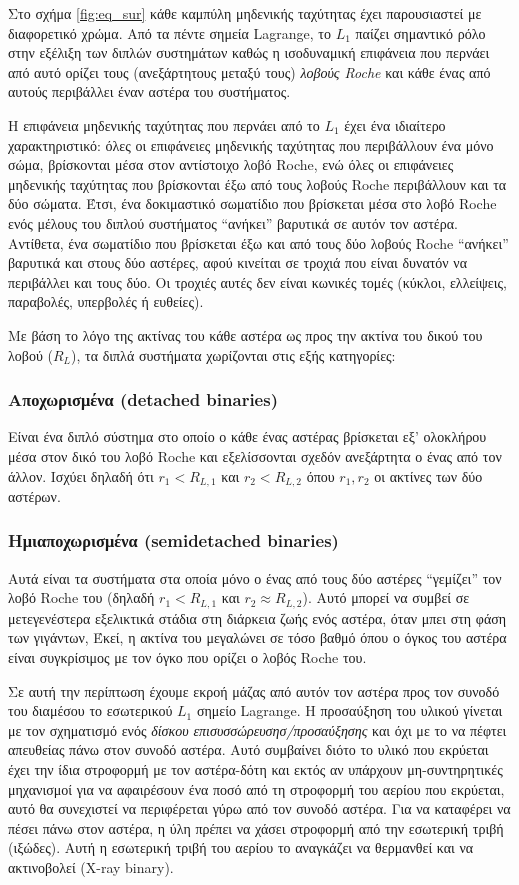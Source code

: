 Στο σχήμα \ref{fig:eq_sur} κάθε καμπύλη μηδενικής ταχύτητας έχει παρουσιαστεί με διαφορετικό χρώμα. Από τα πέντε σημεία Lagrange, το $L_1$ παίζει σημαντικό ρόλο στην εξέλιξη των διπλών συστημάτων καθώς η ισοδυναμική επιφάνεια που περνάει από αυτό ορίζει τους (ανεξάρτητους μεταξύ τους) \textit{λοβούς Roche} και κάθε ένας από αυτούς περιβάλλει έναν αστέρα του συστήματος.

Η επιφάνεια μηδενικής ταχύτητας που περνάει από το $L_1$ έχει ένα ιδιαίτερο χαρακτηριστικό: όλες οι επιφάνειες μηδενικής ταχύτητας που περιβάλλουν ένα μόνο σώμα, βρίσκονται μέσα στον αντίστοιχο λοβό Roche, ενώ όλες οι επιφάνειες μηδενικής ταχύτητας που βρίσκονται έξω από τους λοβούς Roche περιβάλλουν και τα δύο σώματα. Έτσι, ένα δοκιμαστικό σωματίδιο που βρίσκεται μέσα στο λοβό Roche ενός μέλους του διπλού συστήματος ``ανήκει'' βαρυτικά σε αυτόν τον αστέρα. Αντίθετα, ένα σωματίδιο που βρίσκεται έξω και από τους δύο λοβούς Roche ``ανήκει'' βαρυτικά και στους δύο αστέρες, αφού κινείται σε τροχιά που είναι δυνατόν να περιβάλλει και τους δύο. Οι τροχιές αυτές δεν είναι κωνικές τομές (κύκλοι, ελλείψεις, παραβολές, υπερβολές ή ευθείες).

Με βάση το λόγο της ακτίνας του κάθε αστέρα ως προς την ακτίνα του δικού του λοβού ($R_L$), τα διπλά συστήματα χωρίζονται στις εξής κατηγορίες:

\subsubsection{Αποχωρισμένα (detached binaries)}
Είναι ένα διπλό σύστημα στο οποίο ο κάθε ένας αστέρας βρίσκεται εξ' ολοκλήρου μέσα στον δικό του λοβό Roche και εξελίσσονται σχεδόν ανεξάρτητα ο ένας από τον άλλον. Ισχύει δηλαδή ότι $r_1 < R_{L,1}$ και $r_2 < R_{L,2}$ όπου $r_1, r_2$ οι ακτίνες των δύο αστέρων.

\subsubsection{Ημιαποχωρισμένα (semidetached binaries)}
Αυτά είναι τα συστήματα στα οποία μόνο ο ένας από τους δύο αστέρες ``γεμίζει'' τον λοβό Roche του (δηλαδή $r_1 < R_{L,1}$ και $r_2 \approx R_{L,2}$). Αυτό μπορεί να συμβεί σε μετεγενέστερα εξελικτικά στάδια στη διάρκεια ζωής ενός αστέρα, όταν μπει στη φάση των γιγάντων,
Έκεί, η ακτίνα του μεγαλώνει σε τόσο βαθμό όπου ο όγκος του αστέρα είναι συγκρίσιμος με  τον όγκο που ορίζει ο λοβός Roche του.

Σε αυτή την περίπτωση έχουμε εκροή μάζας από αυτόν τον αστέρα προς τον συνοδό του διαμέσου το εσωτερικού $L_1$ σημείο Lagrange. Η προσαύξηση του υλικού γίνεται με τον σχηματισμό ενός \textit{δίσκου επισυσσώρευσησ/προσαύξησης} και όχι με το να πέφτει απευθείας πάνω στον συνοδό αστέρα. Αυτό συμβαίνει διότο το υλικό που εκρύεται έχει την ίδια στροφορμή με τον αστέρα-δότη και εκτός αν υπάρχουν μη-συντηρητικές μηχανισμοί για να αφαιρέσουν ένα ποσό από τη στροφορμή του αερίου που εκρύεται, αυτό θα συνεχιστεί να περιφέρεται γύρω από τον συνοδό αστέρα. Για να καταφέρει να πέσει πάνω στον αστέρα, η ύλη πρέπει να χάσει στροφορμή από την εσωτερική τριβή (ιξώδες). Αυτή η εσωτερική τριβή του αερίου το αναγκάζει να θερμανθεί και να ακτινοβολεί (X-ray binary).

